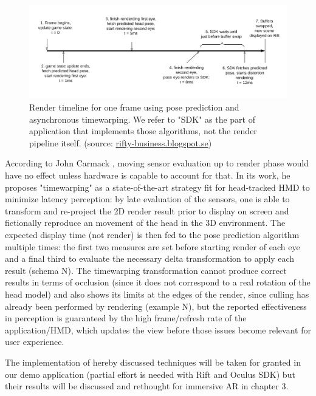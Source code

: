 \begin{figure}
\centering
\includegraphics[width=\linewidth]{schemas/timewarp-timeline}
\caption{Render timeline for one frame using pose prediction and asynchronous timewarping. We refer to "SDK" as the part of application that implements those algorithms, not the render pipeline itself. (source: \href{http://rifty-business.blogspot.se/2014/08/using-timewarp-on-oculus-rift.html}{rifty-business.blogspot.se})}
\label{fig:timewarp_timeline}
\end{figure}

According to John Carmack \cite{karmack_mitigation}, moving sensor evaluation up to render phase would have no effect unless hardware is capable to account for that. In its work, he proposes "timewarping" as a state-of-the-art strategy fit for head-tracked HMD to minimize latency perception: by late evaluation of the sensors, one is able to transform and re-project the 2D render result prior to display on screen and fictionally reproduce an movement of the head in the 3D environment. The expected display time (not render) is then fed to the pose prediction algorithm multiple times: the first two measures are set before starting render of each eye and a final third to evaluate the necessary delta transformation to apply each result (schema N). The timewarping transformation cannot produce correct results in terms of occlusion (since it does not correspond to a real rotation of the head model) and also shows its limits at the edges of the render, since culling has already been performed by rendering (example N), but the reported effectiveness in perception is guaranteed by the high frame/refresh rate of the application/HMD, which updates the view before those issues become relevant for user experience.

The implementation of hereby discussed techniques will be taken for granted in our demo application (partial effort is needed with Rift and Oculus SDK) but their results will be discussed and rethought for immersive AR in chapter 3.

